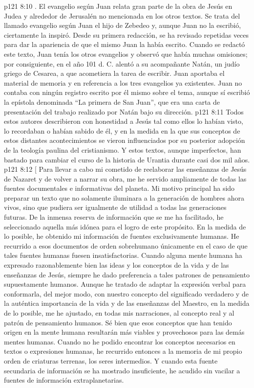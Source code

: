 \vs p121 8:10 . El evangelio según Juan relata gran parte de la obra de Jesús en Judea y alrededor de Jerusalén no mencionada en los otros textos. Se trata del llamado evangelio según Juan el hijo de Zebedeo y, aunque Juan no la escribió, ciertamente la inspiró. Desde su primera redacción, se ha revisado repetidas veces para dar la apariencia de que el mismo Juan la había escrito. Cuando se redactó este texto, Juan tenía los otros evangelios y observó que había muchas omisiones; por consiguiente, en el año 101 d. C. alentó a su acompañante Natán, un judío griego de Cesarea, a que acometiera la tarea de escribir. Juan aportaba el material de memoria y en referencia a los tres evangelios ya existentes. Juan no contaba con ningún registro escrito por él mismo sobre el tema, aunque sí escribió la epístola denominada “La primera de San Juan”, que era una carta de presentación del trabajo realizado por Natán bajo su dirección.
\vs p121 8:11 \pc Todos estos autores describieron con honestidad a Jesús tal como ellos lo habían visto, lo recordaban o habían sabido de él, y en la medida en la que sus conceptos de estos distantes acontecimientos se vieron influenciados por su posterior adopción de la teología paulina del cristianismo. Y estos textos, aunque imperfectos, han bastado para cambiar el curso de la historia de Urantia durante casi dos mil años.
\vsetoff
\vs p121 8:12 [ Para llevar a cabo mi cometido de reelaborar las enseñanzas de Jesús de Nazaret y de volver a narrar su obra, me he servido ampliamente de todas las fuentes documentales e informativas del planeta. Mi motivo principal ha sido preparar un texto que no solamente iluminara a la generación de hombres ahora vivos, sino que pudiera ser igualmente de utilidad a todas las generaciones futuras. De la inmensa reserva de información que se me ha facilitado, he seleccionado aquella más idónea para el logro de este propósito. En la medida de lo posible, he obtenido mi información de fuentes exclusivamente humanas. He recurrido a esos documentos de orden sobrehumano únicamente en el caso de que tales fuentes humanas fuesen insatisfactorias. Cuando alguna mente humana ha expresado razonablemente bien las ideas y los conceptos de la vida y de las enseñanzas de Jesús, siempre he dado preferencia a tales patrones de pensamiento supuestamente humanos. Aunque he tratado de adaptar la expresión verbal para conformarla, del mejor modo, con nuestro concepto del significado verdadero y de la auténtica importancia de la vida y de las enseñanzas del Maestro, en la medida de lo posible, me he ajustado, en todas mis narraciones, al concepto real y al patrón de pensamiento humanos. Sé bien que esos conceptos que han tenido origen en la mente humana resultarán más viables y provechosos para las demás mentes humanas. Cuando no he podido encontrar los conceptos necesarios en textos o expresiones humanas, he recurrido entonces a la memoria de mi propio orden de criaturas terrenas, los seres intermedios. Y cuando esta fuente secundaria de información se ha mostrado insuficiente, he acudido sin vacilar a fuentes de información extraplanetarias.
